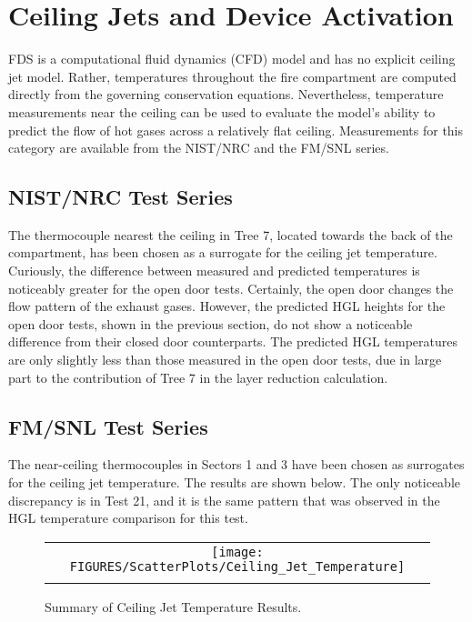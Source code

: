 
\chapter{Ceiling Jets and Device Activation}

FDS is a computational fluid dynamics (CFD) model and has no explicit ceiling jet model.
Rather, temperatures throughout the fire compartment are computed directly from the governing conservation equations.
Nevertheless, temperature measurements near the ceiling can be used to evaluate the model's ability to predict the flow of
hot gases across a relatively flat ceiling. Measurements for this category are available from the NIST/NRC and the FM/SNL series.

\section{NIST/NRC Test Series}

The thermocouple nearest the ceiling in Tree 7, located towards the back of the compartment,
has been chosen as a surrogate for the ceiling jet temperature.
Curiously, the difference between measured and predicted temperatures is noticeably greater for the open door tests.
Certainly, the open door changes the flow pattern of the exhaust gases.
However, the predicted HGL heights for the open door tests, shown in the previous section,
do not show a noticeable difference from their closed door counterparts.
The predicted HGL temperatures are only slightly less than those measured in the open door tests,
due in large part to the contribution of Tree 7 in the layer reduction calculation.



\section{FM/SNL Test Series}

The near-ceiling thermocouples in Sectors 1 and 3 have been chosen as surrogates for the ceiling jet temperature.
The results are shown below.  The only noticeable discrepancy is in Test 21, and it is the same pattern that
was observed in the HGL temperature comparison for this test.

\begin{figure}[p]
\begin{center}
\begin{tabular}{c}
\texttt{[image: FIGURES/ScatterPlots/Ceiling\_Jet\_Temperature]} \\
\vspace{0.25in}
\end{tabular}
\caption{Summary of Ceiling Jet Temperature Results.}
\end{center}
\end{figure}



